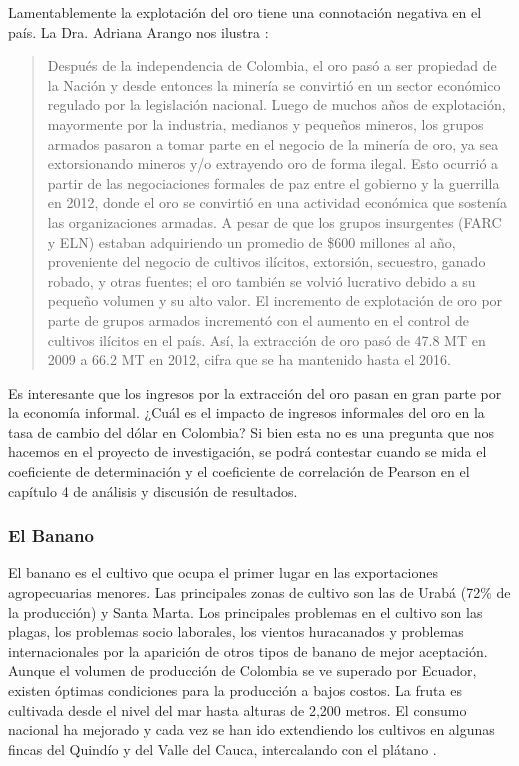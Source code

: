 Lamentablemente la explotación del oro tiene una connotación negativa en el país. La Dra. Adriana Arango nos ilustra \cite{arango_2017}:

\begin{quote}
Después de la independencia de Colombia, el oro pasó a ser propiedad de la Nación y desde entonces la minería se convirtió en un sector económico regulado por la legislación nacional. Luego de muchos años de explotación, mayormente por la industria, medianos y pequeños mineros, los grupos armados pasaron a tomar parte en el negocio de la minería de oro, ya sea extorsionando mineros y/o extrayendo oro de forma ilegal. Esto ocurrió a partir de las negociaciones formales de paz entre el gobierno y la guerrilla en 2012, donde el oro se convirtió en una actividad económica que sostenía las organizaciones armadas. A pesar de que los grupos insurgentes (FARC y ELN) estaban adquiriendo un promedio de \$600 millones al año, proveniente del negocio de cultivos ilícitos, extorsión, secuestro, ganado robado, y otras fuentes; el oro también se volvió lucrativo debido a su pequeño volumen y su alto valor. El incremento de explotación de oro por parte de grupos armados incrementó con el aumento en el control de cultivos ilícitos en el país. Así, la extracción de oro pasó de 47.8 MT en 2009 a 66.2 MT en 2012, cifra que se ha mantenido hasta el 2016.
\end{quote}

Es interesante que los ingresos por la extracción del oro pasan en gran parte por la economía informal. ¿Cuál es el impacto de ingresos informales del oro en la tasa de cambio del dólar en Colombia? Si bien esta no es una pregunta que nos hacemos en el proyecto de investigación, se podrá contestar cuando se mida el coeficiente de determinación y el coeficiente de correlación de Pearson en el capítulo 4 de análisis y discusión de resultados.  

\subsubsection{El Banano}
El banano es el cultivo que ocupa el primer lugar en las exportaciones agropecuarias menores. Las principales zonas de cultivo son las de Urabá (72\% de la producción) y Santa Marta. Los principales problemas en el cultivo son las plagas, los problemas socio laborales, los vientos huracanados y problemas internacionales por la aparición de otros tipos de banano de mejor aceptación. Aunque el volumen de producción de Colombia se ve superado por Ecuador, existen óptimas condiciones para la producción a bajos costos. La fruta es cultivada desde el nivel del mar hasta alturas de 2,200 metros. El consumo nacional ha mejorado y cada vez se han ido extendiendo los cultivos en algunas fincas del Quindío y del Valle del Cauca, intercalando con el plátano \cite{bananoC}.

